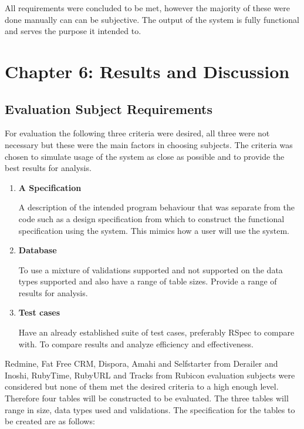 \documentclass[a4paper,12pt]{article}
\begin{document}
\par All requirements were concluded to be met, however the majority of these were done manually can can be subjective. The output of the system is fully functional and serves the purpose it intended to.


\section{Chapter 6: Results and Discussion}

\subsection{Evaluation Subject Requirements}
\par For evaluation the following three criteria were desired, all three were not necessary but these were the main factors in choosing subjects. The criteria was chosen to simulate usage of the system as close as possible and to provide the best results for analysis.
\begin{enumerate}
\item \textbf{A Specification}
\par A description of the intended program behaviour that was separate from the code such as a design specification from which to construct the functional specification using the system. This mimics how a user will use the system.
\item \textbf{Database}
\par To use a mixture of validations supported and not supported on the data types supported and also have a range of table sizes. Provide a range of results for analysis.
\item \textbf{Test cases}
\par Have an already established suite of test cases, preferably RSpec to compare with. To compare results and analyze efficiency and effectiveness.
\end{enumerate}

\cite{near2012rubicon}
\cite{near2014derailer}
\par Redmine, Fat Free CRM, Dispora, Amahi and Selfstarter from Derailer\cite{near2014derailer} and Inoshi, RubyTime, RubyURL and Tracks from Rubicon\cite{near2012rubicon} evaluation subjects were considered but none of them met the desired criteria to a high enough level. Therefore four tables will be constructed to be evaluated. The three tables will range in size, data types used and validations. The specification for the tables to be created are as follows:
\end{document}

